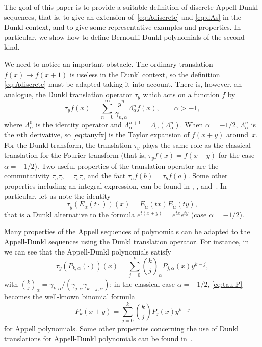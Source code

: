 \documentclass[11pt]{article}
\theoremstyle{plain}
\theoremstyle{remark}
\numberwithin{equation}{section} %
\newcommand{\La}{\Lambda_{\alpha}}
\newcommand{\binoma}[2]{\binom{#1}{#2}_{\!\alpha}}
\newcommand{\cc}{\gamma}
\begin{document}
The goal of this paper is to provide a suitable definition of discrete Appell-Dunkl
sequences, that is, to give an extension of~\eqref{eq:Adiscrete} and \eqref{eq:dAs} in the Dunkl context,
and to give some representative examples and properties. 
In particular, we show how to define Bernoulli-Dunkl polynomials of the second kind.

We need to notice an important obstacle. The ordinary translation $f(x) \mapsto f(x+1)$ is
useless in the Dunkl context, so the definition \eqref{eq:Adiscrete} must be adapted
taking it into account. 
There is, however, an analogue, the Dunkl translation operator $\tau_y$ which acts on a function $f$ by
\begin{equation}
\label{eq:tauyfx}
  \tau_y f(x) = \sum_{n=0}^\infty \frac{y^n}{\cc_{n,\alpha}}\La^{n}f(x),
  \qquad \alpha>-1,
\end{equation}
where $\La^0$ is the identity operator and $\La^{n+1} = \La(\La^n)$. 
When $\alpha=-1/2$, $\La^{n}$ is the $n$th derivative, 
so \eqref{eq:tauyfx} is the Taylor expansion of $f(x+y)$ around~$x$.
For the Dunkl transform, the translation $\tau_y$ plays the same role as the classical translation for the Fourier transform (that is, $\tau_y f(x) = f(x+y)$ for the case $\alpha=-1/2$). 
Two useful properties of the translation operator are the commutativity $\tau_a\tau_b = \tau_b\tau_a$ and the fact $\tau_a f(b) = \tau_b f(a)$.
Some other properties including an integral expression, can be found in \cite{Ros}, \cite{Rosler-TAMS}, and~\cite{ThX}.
In particular, let us note the identity \cite[formula (4.2.2)]{Ros}
\begin{equation}
\label{eq:Etxy}
  \tau_y(E_\alpha(t\cdot))(x) = E_\alpha(tx) E_\alpha (ty),
\end{equation}
that is a Dunkl alternative to the formula $e^{t(x+y)} = e^{tx}e^{ty}$ (case $\alpha=-1/2$).

Many properties of the Appell sequences of polynomials can be adapted to the Appell-Dunkl sequences
using the Dunkl translation operator.
For instance, in~\cite{CDPV, CMV} we can see that the Appell-Dunkl polynomials satisfy
\begin{equation}
\label{eq:tau-P}
  \tau_y(P_{k,\alpha}(\cdot))(x)
  = \sum_{j=0}^k \binoma{k}{j} P_{j,\alpha}(x) y^{k-j},
\end{equation}
with $\binoma{k}{j} = \cc_{k,\alpha}/(\cc_{j,\alpha}\cc_{k-j,\alpha})$;
in the classical case $\alpha=-1/2$, \eqref{eq:tau-P} becomes the well-known binomial formula
\begin{equation}
\label{eq:binom}
  P_k(x+y) = \sum_{j=0}^k \binom{k}{j} P_j(x)y^{k-j}
\end{equation}
for Appell polynomials. 
Some other properties concerning the use of Dunkl translations
for Appell-Dunkl polynomials can be found in~\cite{CMV}.
\end{document}
